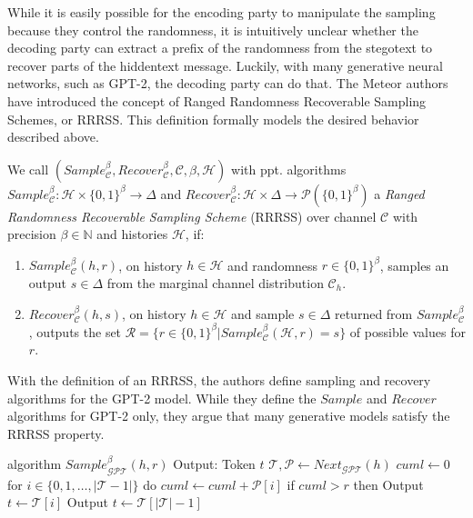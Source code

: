 While it is easily possible for the encoding party to manipulate the sampling because they control the randomness, it is intuitively unclear whether the decoding party can extract a prefix of the randomness from the stegotext to recover parts of the hiddentext message.
Luckily, with many generative neural networks, such as GPT-2, the decoding party can do that.
The Meteor authors have introduced the concept of Ranged Randomness Recoverable Sampling Schemes, or RRRSS.
This definition formally models the desired behavior described above.
\begin{definition}
  \label{def:rrrss}
  We call 
  $(Sample_{\mathcal{C}}^\beta, Recover_{\mathcal{C}}^\beta, \mathcal{C}, \beta, \mathcal{H})$ 
  with ppt. algorithms
  $Sample_{\mathcal{C}}^\beta \colon \mathcal{H} \times \{0,1\}^\beta \rightarrow \Delta$ 
  and 
  $Recover_{\mathcal{C}}^\beta \colon \mathcal{H} \times \Delta \rightarrow \mathcal{P}(\{0,1\}^\beta)$ 
  a \emph{Ranged Randomness Recoverable Sampling Scheme} (RRRSS) over channel $\mathcal{C}$ with precision $\beta \in \mathbb{N}$ and histories $\mathcal{H}$, if:
  
  \begin{enumerate}
    \item $Sample_{\mathcal{C}}^\beta(h, r)$, on history $h \in \mathcal{H}$ and randomness $r \in \{0,1\}^\beta$, samples an output $s \in \Delta$ from the marginal channel distribution $\mathcal{C}_h$.
    \item $Recover_{\mathcal{C}}^\beta(h, s)$, on history $h \in \mathcal{H}$ and sample $s \in \Delta$ returned from $Sample_{\mathcal{C}}^\beta$, outputs the set $\mathcal{R} = \{ r \in \{0,1\}^\beta | Sample_{\mathcal{C}}^\beta(\mathcal{H}, r) = s \}$ of possible values for $r$.
  \end{enumerate}
\end{definition}
With the definition of an RRRSS, the authors define sampling and recovery algorithms for the GPT-2 model.
While they define the $Sample$ and $Recover$ algorithms for GPT-2 only, they argue that many generative models satisfy the RRRSS property.

\begin{Pseudocode}[caption={
RRRSS $Sample$ algorithm for GPT-2 \cite{Meteor2021}.
$Sample$ produces, given a history $h$ and a value $r$, the next token sampled according to $r$ from the distribution generated by $\mathcal{C}_h = Next_{\mathcal{GPT}}(h)$.
}]
algorithm $Sample_{\mathcal{GPT}}^\beta(  h, r)$
  Output: Token $t$
  $\mathcal{T}, \mathcal{P} \leftarrow Next_{\mathcal{GPT}}(h)$
  $cuml \leftarrow 0$
  for $i \in \{ 0, 1, \dots, | \mathcal{T} - 1 | \}$ do
    $cuml \leftarrow cuml + \mathcal{P}[i]$
    if $cuml > r$ then
      Output $t \leftarrow \mathcal{T}[i]$
  Output $t \leftarrow \mathcal{T}[|\mathcal{T}|-1]$
\end{Pseudocode}

